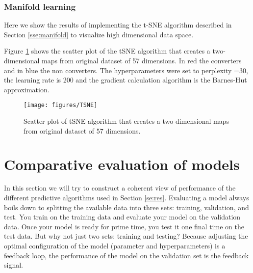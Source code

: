 \documentclass[11pt]{article}
\theoremstyle{definition}
\theoremstyle{remark}
\begin{document}
\subsubsection{Manifold learning}
\label{sse:resmanifold}
Here we show the results of implementing the t-SNE algorithm described in Section \ref{sse:manifold} to visualize high dimensional data space.


Figure \ref{fig:TSNE} shows the scatter plot of the tSNE algorithm that creates a two-dimensional maps from original dataset of 57 dimensions. In red the converters and in blue the non converters. The hyperparameters were set to perplexity =30, the learning rate is 200 and the  gradient calculation algorithm is the Barnes-Hut approximation.

\begin{figure}[H] 
        \centering
        \texttt{[image: figures/TSNE]}
        \caption{Scatter plot of tSNE algorithm that creates a two-dimensional maps from original dataset of 57 dimensions. 
        } \label{fig:TSNE}
\end{figure}


\section{Comparative evaluation of models}
\label{se:compare}
In this section we will try to construct a coherent view of performance of the different predictive algorithms used in Section \ref{se:res}. 
Evaluating a model always boils down to splitting the available data into three sets: training, validation, and test. You train on the training data and evaluate your model on the validation data. Once your model is ready for prime time, you test it one final time on the test data. 
But why not just two sets: training and testing? Because adjusting the optimal configuration of the model (parameter and hyperparameters) is a feedback loop, the performance of the model on the validation set is the feedback signal.
\end{document}
